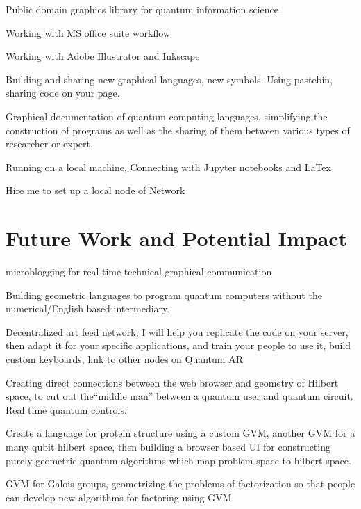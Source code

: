 \documentclass[11pt]{article}
\begin{document}
    Public domain graphics library for quantum information science




    Working with MS office suite workflow




    Working with Adobe Illustrator and Inkscape





    Building and sharing new graphical languages, new symbols.  Using pastebin, sharing code on your page.




    Graphical documentation of quantum computing languages, simplifying the construction of programs as well as the sharing of them between various types of researcher or expert.




    Running on a local machine, Connecting with Jupyter notebooks and LaTex



Hire me to set up a local node of Network


\section{
Future Work and Potential Impact}



    microblogging for real time technical graphical communication




    Building geometric languages to program quantum computers without the numerical/English based intermediary.




    Decentralized art feed network, I will help you replicate the code on your server, then adapt it for your specific applications, and train your people to use it, build custom keyboards, link to other nodes on Quantum AR





Creating direct connections between the web browser and geometry of Hilbert space, to cut out the``middle man'' between a quantum user and quantum circuit.  Real time quantum controls.    




    Create a language for protein structure using a custom GVM, another GVM for a many qubit hilbert space, then building a browser based UI for constructing purely geometric quantum algorithms which map problem space to hilbert space.  




    GVM for Galois groups, geometrizing the problems of factorization so that people can develop new algorithms for factoring using GVM.




    
\end{document}
